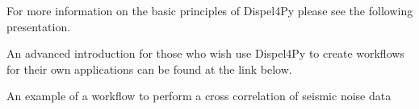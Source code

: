 \documentclass[english]{book}
\begin{document}

For more information on the basic principles of Dispel4Py please see the
following presentation.


An advanced introduction for those who wish use Dispel4Py to create
workflows for their own applications can be found at the link below.



 An example of a workflow to perform a cross
correlation of seismic noise data


\renewcommand{\indexname}{Index}
\printindex
\end{document}
